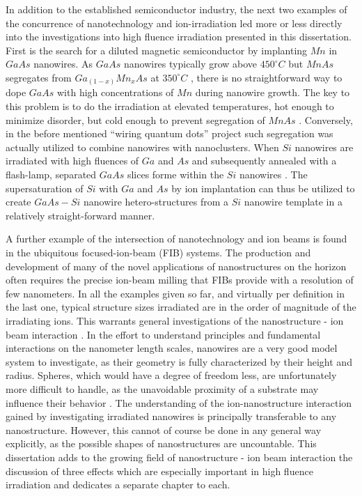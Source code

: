In addition to the established semiconductor industry, the next two examples of the concurrence of nanotechnology and ion-irradiation led more or less directly into the investigations into high fluence irradiation presented in this dissertation. First is the search for a diluted magnetic semiconductor by implanting $Mn$ in $GaAs$ nanowires. As $GaAs$ nanowires typically grow above $450^\circ C$ but $MnAs$ segregates from $Ga_{(1-x)}Mn_xAs$ at $350^\circ C$ \cite{dietl_engineering_2006,sadowski_gaasmnas_2011}, there is no straightforward way to dope $GaAs$ with high concentrations of $Mn$ during nanowire growth. The key to this problem is to do the irradiation at elevated temperatures, hot enough to minimize disorder, but cold enough to prevent segregation of $MnAs$ \cite{borschel_new_2011,paschoal_hopping_2012,borschel_ion-solid_2012,kumar_magnetic_2013,paschoal_magnetoresistance_2014}. Conversely, in the before mentioned ``wiring quantum dots'' project such segregation was actually utilized to combine nanowires with nanoclusters. When $Si$ nanowires are irradiated with high fluences of $Ga$ and $As$ and subsequently annealed with a flash-lamp, separated $GaAs$ slices forme within the $Si$ nanowires \cite{prucnal_iii-v_2014,glaser_personal_2015}. The supersaturation of $Si$ with $Ga$ and $As$ by ion implantation can thus be utilized to create $GaAs - Si$ nanowire hetero-structures from a $Si$ nanowire template in a relatively straight-forward manner.
 
A further example of the intersection of nanotechnology and ion beams is found in the ubiquitous focused-ion-beam (FIB) systems. The production and development of many of the novel applications of nanostructures on the horizon often requires the precise ion-beam milling that FIBs provide with a resolution of few nanometers. In all the examples given so far, and virtually per definition in the last one, typical structure sizes irradiated are in the order of magnitude of the irradiating ions. This warrants general investigations of the nanostructure - ion beam interaction \cite{borschel_ion-solid_2012,greaves_enhanced_2013,nietiadi_sputtering_2014,johannes_ion_2015,urbassek_sputter_2015}. In the effort to understand principles and fundamental interactions on the nanometer length scales, nanowires are a very good model system to investigate, as their geometry is fully characterized by their height and radius. Spheres, which would have a degree of freedom less, are unfortunately more difficult to handle, as the unavoidable proximity of a substrate may influence their behavior \cite{moller_tri3dyn_2014,johannes_ion_2015}. The understanding of the ion-nanostructure interaction gained by investigating irradiated nanowires is principally transferable to any nanostructure. However, this cannot of course be done in any general way explicitly, as the possible shapes of nanostructures are uncountable. This dissertation adds to the growing field of nanostructure - ion beam interaction the discussion of three effects which are especially important in high fluence irradiation and dedicates a separate chapter to each. 
 
